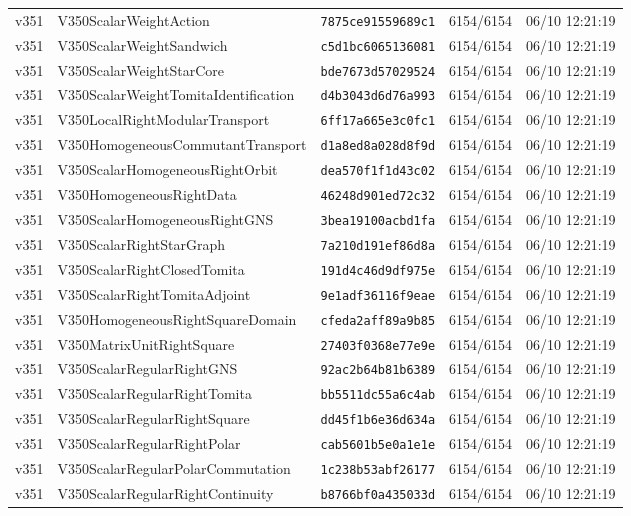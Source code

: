 \documentclass[11pt]{article}
\theoremstyle{definition}\newtheorem{deriv}{Derivation}
\begin{document}
{\begin{longtable}{@{}lllll@{}}
v351 & V350ScalarWeightAction & \texttt{7875ce91559689c1} & 6154/6154 & 06/10 12:21:19 \\
v351 & V350ScalarWeightSandwich & \texttt{c5d1bc6065136081} & 6154/6154 & 06/10 12:21:19 \\
v351 & V350ScalarWeightStarCore & \texttt{bde7673d57029524} & 6154/6154 & 06/10 12:21:19 \\
v351 & V350ScalarWeightTomitaIdentification & \texttt{d4b3043d6d76a993} & 6154/6154 & 06/10 12:21:19 \\
v351 & V350LocalRightModularTransport & \texttt{6ff17a665e3c0fc1} & 6154/6154 & 06/10 12:21:19 \\
v351 & V350HomogeneousCommutantTransport & \texttt{d1a8ed8a028d8f9d} & 6154/6154 & 06/10 12:21:19 \\
v351 & V350ScalarHomogeneousRightOrbit & \texttt{dea570f1f1d43c02} & 6154/6154 & 06/10 12:21:19 \\
v351 & V350HomogeneousRightData & \texttt{46248d901ed72c32} & 6154/6154 & 06/10 12:21:19 \\
v351 & V350ScalarHomogeneousRightGNS & \texttt{3bea19100acbd1fa} & 6154/6154 & 06/10 12:21:19 \\
v351 & V350ScalarRightStarGraph & \texttt{7a210d191ef86d8a} & 6154/6154 & 06/10 12:21:19 \\
v351 & V350ScalarRightClosedTomita & \texttt{191d4c46d9df975e} & 6154/6154 & 06/10 12:21:19 \\
v351 & V350ScalarRightTomitaAdjoint & \texttt{9e1adf36116f9eae} & 6154/6154 & 06/10 12:21:19 \\
v351 & V350HomogeneousRightSquareDomain & \texttt{cfeda2aff89a9b85} & 6154/6154 & 06/10 12:21:19 \\
v351 & V350MatrixUnitRightSquare & \texttt{27403f0368e77e9e} & 6154/6154 & 06/10 12:21:19 \\
v351 & V350ScalarRegularRightGNS & \texttt{92ac2b64b81b6389} & 6154/6154 & 06/10 12:21:19 \\
v351 & V350ScalarRegularRightTomita & \texttt{bb5511dc55a6c4ab} & 6154/6154 & 06/10 12:21:19 \\
v351 & V350ScalarRegularRightSquare & \texttt{dd45f1b6e36d634a} & 6154/6154 & 06/10 12:21:19 \\
v351 & V350ScalarRegularRightPolar & \texttt{cab5601b5e0a1e1e} & 6154/6154 & 06/10 12:21:19 \\
v351 & V350ScalarRegularPolarCommutation & \texttt{1c238b53abf26177} & 6154/6154 & 06/10 12:21:19 \\
v351 & V350ScalarRegularRightContinuity & \texttt{b8766bf0a435033d} & 6154/6154 & 06/10 12:21:19 \\

\end{longtable}}
\end{document}
